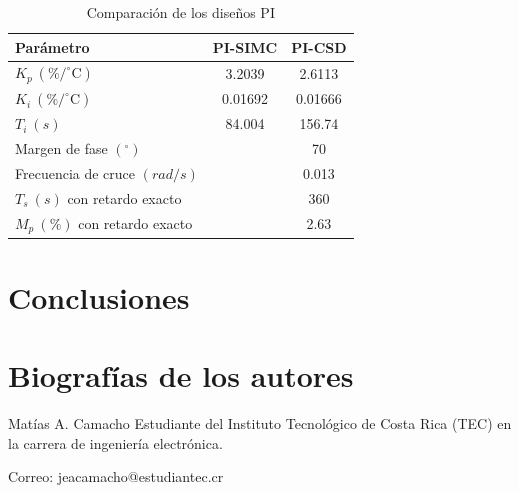 \documentclass[journal]{IEEEtran}
\begin{document}
\begin{table}[H]
  \centering
  \caption{Comparación de los diseños PI}
  \label{tab:comp_PI}
  \renewcommand{\arraystretch}{1.5}
  \begin{tabularx}{\columnwidth}{@{}Ycc@{}}
    \toprule
    \textbf{Parámetro} & \textbf{PI-SIMC} & \textbf{PI-CSD} \\
    \midrule
    $K_p~{(\%/ ^\circ\mathrm{C})}$  & 3.2039 & 2.6113\\
    $K_i~{(\%/ ^\circ\mathrm{C})}$  & 0.01692 & 0.01666\\
    $T_i~{(s)}$                     & 84.004 & 156.74\\
    Margen de fase ${(^\circ)}$     &  & 70\\
    Frecuencia de cruce ${(rad/s)}$ &  & 0.013\\
    $T_s~{(s)}$ con retardo exacto  &  & 360\\
    $M_p~{(\%)}$ con retardo exacto &  & 2.63\\
    \bottomrule
  \end{tabularx}
\end{table}



\section{Conclusiones}



\printbibliography

\section{Biografías de los autores}

 
\begin{IEEEbiographynophoto}{Matías A. Camacho}
        Estudiante del Instituto Tecnológico de Costa Rica (TEC) en la carrera de ingeniería electrónica.
        
        Correo: jeacamacho@estudiantec.cr
\end{IEEEbiographynophoto}
\end{document}
